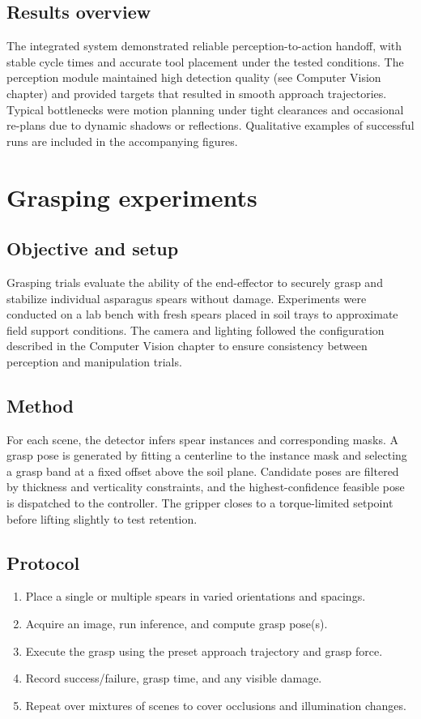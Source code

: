 \subsection*{Results overview}
The integrated system demonstrated reliable perception-to-action handoff, with stable cycle times and accurate tool placement under the 
tested conditions. The perception module maintained high detection quality (see Computer Vision chapter) and provided targets that resulted 
in smooth approach trajectories. Typical bottlenecks were motion planning under tight clearances and occasional re-plans due to dynamic 
shadows or reflections. Qualitative examples of successful runs are included in the accompanying figures.









\section{Grasping experiments}
\subsection*{Objective and setup}
Grasping trials evaluate the ability of the end-effector to securely grasp and stabilize individual asparagus spears without
damage. Experiments were conducted on a lab bench with fresh spears placed in soil trays to approximate field support conditions.
The camera and lighting followed the configuration described in the Computer Vision chapter to ensure consistency between 
perception and manipulation trials.

\subsection*{Method}
For each scene, the detector infers spear instances and corresponding masks. A grasp pose is generated by fitting a centerline to the instance mask and selecting a grasp band at a fixed offset above the soil plane. Candidate poses are filtered by thickness and verticality constraints, and the highest-confidence feasible pose is dispatched to the controller. The gripper closes to a torque-limited setpoint before lifting slightly to test retention.

\subsection*{Protocol}
\begin{enumerate}
  \item Place a single or multiple spears in varied orientations and spacings.
  \item Acquire an image, run inference, and compute grasp pose(s).
  \item Execute the grasp using the preset approach trajectory and grasp force.
  \item Record success/failure, grasp time, and any visible damage.
  \item Repeat over mixtures of scenes to cover occlusions and illumination changes.
\end{enumerate}

